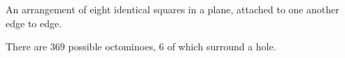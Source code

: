  An arrangement of eight identical squares in a plane, 
attached to one another edge to edge.
\par
There are 369 possible octominoes, 6 of 
which surround a hole.
